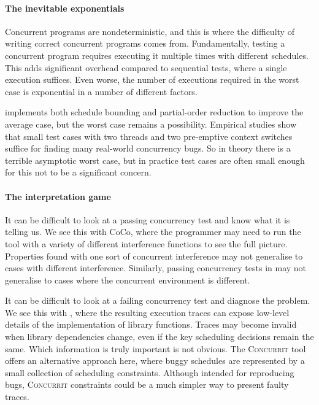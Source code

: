 \paragraph{The inevitable exponentials}
Concurrent programs are nondeterministic, and this is where the
difficulty of writing correct concurrent programs comes from.
Fundamentally, testing a concurrent program requires executing it
multiple times with different schedules.  This adds significant
overhead compared to sequential tests, where a single execution
suffices.  Even worse, the number of executions required in the worst
case is exponential in a number of different
factors\cite{musuvathi2007}.

\dejafu{} implements both schedule
bounding\cite{emmi2011,musuvathi2008,musuvathi2007} and partial-order
reduction\cite{flanagan2005,godefroid1996} to improve the average
case, but the worst case remains a possibility.  Empirical studies
show that small test cases with two threads and two pre-emptive
context switches suffice for finding many real-world concurrency
bugs\cite{thomson2014}.  So in theory there is a terrible asymptotic
worst case, but in practice test cases are often small enough for this
not to be a significant concern.

\paragraph{The interpretation game}
It can be difficult to look at a passing concurrency test and know
what it is telling us.  We see this with CoCo, where the programmer
may need to run the tool with a variety of different interference
functions to see the full picture.  Properties found with one sort of
concurrent interference may not generalise to cases with different
interference.  Similarly, passing concurrency tests in \dejafu{} may
not generalise to cases where the concurrent environment is different.

It can be difficult to look at a failing concurrency test and diagnose
the problem.  We see this with \dejafu{}, where the resulting
execution traces can expose low-level details of the implementation of
library functions.  Traces may become invalid when library
dependencies change, even if the key scheduling decisions remain the
same.  Which information is truly important is not obvious.  The
\textsc{Concurrit}\cite{elmas2013} tool offers an alternative approach
here, where buggy schedules are represented by a small collection of
scheduling constraints.  Although intended for reproducing bugs,
\textsc{Concurrit} constraints could be a much simpler way to present
faulty traces.

